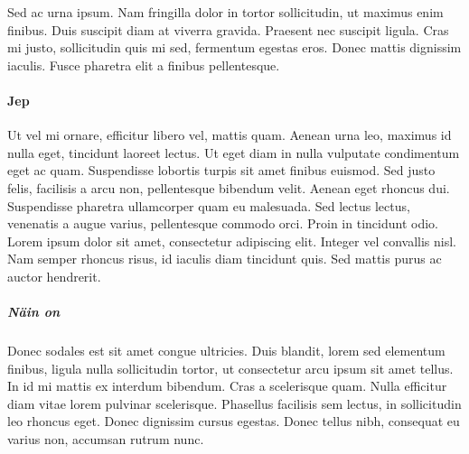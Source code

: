 \documentclass[12pt,a4paper,titlepage]{article}
\begin{document}
Sed ac urna ipsum. Nam fringilla dolor in tortor sollicitudin, ut maximus enim finibus. Duis suscipit diam at viverra gravida. Praesent nec suscipit ligula. Cras mi justo, sollicitudin quis mi sed, fermentum egestas eros. Donec mattis dignissim iaculis. Fusce pharetra elit a finibus pellentesque.

\paragraph{Jep}
Ut vel mi ornare, efficitur libero vel, mattis quam. Aenean urna leo, maximus id nulla eget, tincidunt laoreet lectus. Ut eget diam in nulla vulputate condimentum eget ac quam. Suspendisse lobortis turpis sit amet finibus euismod. Sed justo felis, facilisis a arcu non, pellentesque bibendum velit. Aenean eget rhoncus dui. Suspendisse pharetra ullamcorper quam eu malesuada. Sed lectus lectus, venenatis a augue varius, pellentesque commodo orci. Proin in tincidunt odio. Lorem ipsum dolor sit amet, consectetur adipiscing elit. Integer vel convallis nisl. Nam semper rhoncus risus, id iaculis diam tincidunt quis. Sed mattis purus ac auctor hendrerit.

\subparagraph{Näin on}
Donec sodales est sit amet congue ultricies. Duis blandit, lorem sed elementum finibus, ligula nulla sollicitudin tortor, ut consectetur arcu ipsum sit amet tellus. In id mi mattis ex interdum bibendum. Cras a scelerisque quam. Nulla efficitur diam vitae lorem pulvinar scelerisque. Phasellus facilisis sem lectus, in sollicitudin leo rhoncus eget. Donec dignissim cursus egestas. Donec tellus nibh, consequat eu varius non, accumsan rutrum nunc. 
\end{document}
